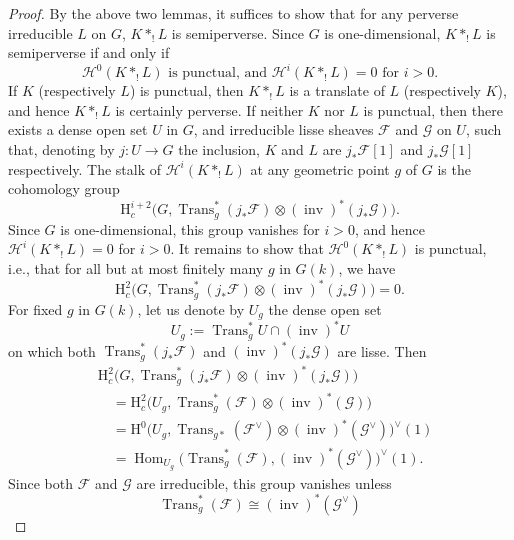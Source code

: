 \begin{proof}
By the above two lemmas, it suffices to show that for any perverse irreducible
\(L\) on \(G\), \(K*_!L\) is semiperverse. Since \(G\) is one-dimensional,
\(K*_!L\) is semiperverse if and only if
\[
  \mathcal{H}^0(K*_!L)\text{ is punctual, and }
  \mathcal{H}^i(K*_!L)=0\text{ for }i>0.
\]
If \(K\) (respectively \(L\)) is punctual, then \(K*_!L\) is a translate of
\(L\) (respectively \(K\)), and hence \(K*_!L\) is certainly perverse. If
neither \(K\) nor \(L\) is punctual, then there exists a dense open set \(U\)
in \(G\), and irreducible lisse sheaves \(\mathcal{F}\) and \(\mathcal{G}\) on
\(U\), such that, denoting by \(j:U\to G\) the inclusion, \(K\) and \(L\) are
\(j_*\mathcal{F}[1]\) and \(j_*\mathcal{G}[1]\) respectively. The stalk of
\(\mathcal{H}^i(K*_!L)\) at any geometric point \(g\) of \(G\) is the
cohomology group
\[
  \mathrm{H}^{i+2}_c\bigl(G,\operatorname{Trans}_g^*(j_*\mathcal{F})
  \otimes(\operatorname{inv})^*(j_*\mathcal{G})\bigr).
\]
Since \(G\) is one-dimensional, this group vanishes for \(i>0\), and hence
\(\mathcal{H}^i(K*_!L)=0\) for \(i>0\). It remains to show that
\(\mathcal{H}^0(K*_!L)\) is punctual, i.e., that for all but at most finitely
many \(g\) in \(G(k)\), we have
\[
  \mathrm{H}^2_c\bigl(G,\operatorname{Trans}_g^*(j_*\mathcal{F})
  \otimes(\operatorname{inv})^*(j_*\mathcal{G})\bigr)=0.
\]
For fixed \(g\) in \(G(k)\), let us denote by \(U_g\) the dense open set
\[
  U_g:=\operatorname{Trans}_g^*U\cap(\operatorname{inv})^*U
\]
on which both \(\operatorname{Trans}_g^*(j_*\mathcal{F})\) and
\((\operatorname{inv})^*(j_*\mathcal{G})\) are lisse. Then
\[
\begin{aligned}
  &\mathrm{H}^2_c\bigl(G,\operatorname{Trans}_g^*(j_*\mathcal{F})
  \otimes(\operatorname{inv})^*(j_*\mathcal{G})\bigr)\\
  &\quad=
  \mathrm{H}^2_c\bigl(U_g,\operatorname{Trans}_g^*(\mathcal{F})
  \otimes(\operatorname{inv})^*(\mathcal{G})\bigr)\\
  &\quad=
  \mathrm{H}^0\bigl(U_g,
  \operatorname{Trans}_{g*}(\mathcal{F}^{\vee})
  \otimes(\operatorname{inv})^*(\mathcal{G}^{\vee})\bigr)^{\vee}(1)\\
  &\quad=
  \operatorname{Hom}_{U_g}\bigl(\operatorname{Trans}_g^*(\mathcal{F}),
  (\operatorname{inv})^*(\mathcal{G}^{\vee})\bigr)^{\vee}(1).
\end{aligned}
\]
Since both \(\mathcal{F}\) and \(\mathcal{G}\) are irreducible, this group
vanishes unless
\[
  \operatorname{Trans}_g^*(\mathcal{F})
  \cong(\operatorname{inv})^*(\mathcal{G}^{\vee})
\]
\end{proof}
